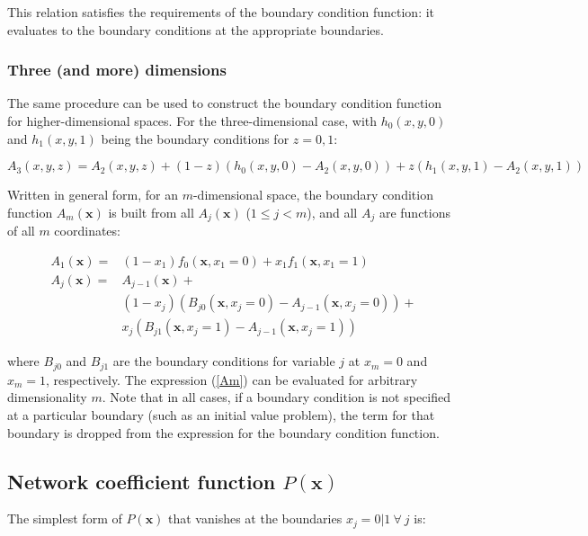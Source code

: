 \documentclass{article}
\begin{document}
\noindent This relation satisfies the requirements of the boundary condition function: it evaluates to the boundary conditions at the appropriate boundaries.

\subsubsection{Three (and more) dimensions}

The same procedure can be used to construct the boundary condition function for higher-dimensional spaces. For the three-dimensional case, with $h_0(x,y,0)$ and $h_1(x,y,1)$ being the boundary conditions for $z=0,1$:

\begin{equation}
  A_3(x,y,z) = A_2(x,y,z) + (1-z)(h_0(x,y,0) - A_2(x,y,0)) + z(h_1(x,y,1) - A_2(x,y,1))
\end{equation}

Written in general form, for an $m$-dimensional space, the boundary condition function $A_m(\mathbf x)$ is built from all $A_j(\mathbf x)$ ($1 \leq j < m$), and all $A_j$ are functions of all $m$ coordinates:

\begin{equation}
\begin{split}
  A_1(\mathbf x) = &(1-x_1)f_0(\mathbf x,x_1=0) + x_1 f_1(\mathbf x,x_1=1) \\
  A_j(\mathbf x) = &A_{j-1}(\mathbf x) + \\
  &(1-x_j)(B_{j0}(\mathbf x,x_j=0) - A_{j-1}(\mathbf x,x_j=0)) + \\
  &x_j(B_{j1}(\mathbf x,x_j=1) - A_{j-1}(\mathbf x,x_j=1))
\end{split}
\label{Am}
\end{equation}

\noindent where $B_{j0}$ and $B_{j1}$ are the boundary conditions for variable $j$ at $x_m=0$ and $x_m=1$, respectively. The expression (\ref{Am}) can be evaluated for arbitrary dimensionality $m$. Note that in all cases, if a boundary condition is not specified at a particular boundary (such as an initial value problem), the term for that boundary is dropped from the expression for the boundary condition function.

\subsection{Network coefficient function $P(\mathbf x)$}

The simplest form of $P(\mathbf x)$ that vanishes at the boundaries $x_j = 0|1 ~\forall~j$ is:
\end{document}
